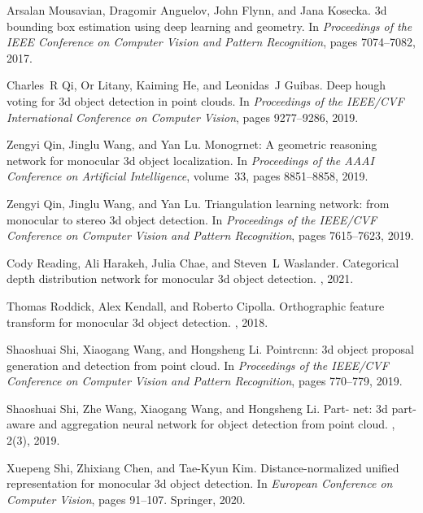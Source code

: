 \documentclass[10pt,twocolumn,letterpaper]{article}
\begin{document}
{\begin{thebibliography}{10}
Arsalan Mousavian, Dragomir Anguelov, John Flynn, and Jana Kosecka.
\newblock 3d bounding box estimation using deep learning and geometry.
\newblock In {\em Proceedings of the IEEE Conference on Computer Vision and
  Pattern Recognition}, pages 7074--7082, 2017.

Charles~R Qi, Or Litany, Kaiming He, and Leonidas~J Guibas.
\newblock Deep hough voting for 3d object detection in point clouds.
\newblock In {\em Proceedings of the IEEE/CVF International Conference on
  Computer Vision}, pages 9277--9286, 2019.

Zengyi Qin, Jinglu Wang, and Yan Lu.
\newblock Monogrnet: A geometric reasoning network for monocular 3d object
  localization.
\newblock In {\em Proceedings of the AAAI Conference on Artificial
  Intelligence}, volume~33, pages 8851--8858, 2019.

Zengyi Qin, Jinglu Wang, and Yan Lu.
\newblock Triangulation learning network: from monocular to stereo 3d object
  detection.
\newblock In {\em Proceedings of the IEEE/CVF Conference on Computer Vision and
  Pattern Recognition}, pages 7615--7623, 2019.

Cody Reading, Ali Harakeh, Julia Chae, and Steven~L Waslander.
\newblock Categorical depth distribution network for monocular 3d object
  detection.
, 2021.

Thomas Roddick, Alex Kendall, and Roberto Cipolla.
\newblock Orthographic feature transform for monocular 3d object detection.
, 2018.

Shaoshuai Shi, Xiaogang Wang, and Hongsheng Li.
\newblock Pointrcnn: 3d object proposal generation and detection from point
  cloud.
\newblock In {\em Proceedings of the IEEE/CVF Conference on Computer Vision and
  Pattern Recognition}, pages 770--779, 2019.

Shaoshuai Shi, Zhe Wang, Xiaogang Wang, and Hongsheng Li.
\newblock Part- net: 3d part-aware and aggregation neural network for
  object detection from point cloud.
, 2(3), 2019.

Xuepeng Shi, Zhixiang Chen, and Tae-Kyun Kim.
\newblock Distance-normalized unified representation for monocular 3d object
  detection.
\newblock In {\em European Conference on Computer Vision}, pages 91--107.
  Springer, 2020.


\end{thebibliography}}
\end{document}
